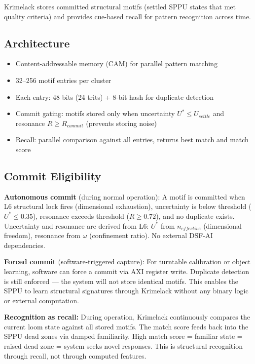 \documentclass[11pt, a4paper]{article}
\begin{document}
Krimelack stores committed structural motifs (settled SPPU states
that met quality criteria) and provides cue-based recall for
pattern recognition across time.

\subsection{Architecture}

\begin{itemize}[nosep]
  \item Content-addressable memory (CAM) for parallel pattern matching
  \item 32--256 motif entries per cluster
  \item Each entry: 48 bits (24 trits) + 8-bit hash for duplicate detection
  \item Commit gating: motifs stored only when uncertainty $U^* \leq U_{settle}$
        and resonance $R \geq R_{commit}$ (prevents storing noise)
  \item Recall: parallel comparison against all entries, returns best match
        and match score
\end{itemize}

\subsection{Commit Eligibility}

\textbf{Autonomous commit} (during normal operation):
A motif is committed when L6 structural lock fires (dimensional
exhaustion), uncertainty is below threshold ($U^* \leq 0.35$),
resonance exceeds threshold ($R \geq 0.72$), and no duplicate
exists. Uncertainty and resonance are derived from L6: $U^*$ from
$n_{effective}$ (dimensional freedom), resonance from $\omega$
(confinement ratio). No external DSF-AI dependencies.

\textbf{Forced commit} (software-triggered capture):
For turntable calibration or object learning, software can force
a commit via AXI register write. Duplicate detection is still
enforced --- the system will not store identical motifs. This
enables the SPPU to learn structural signatures through Krimelack
without any binary logic or external computation.

\textbf{Recognition as recall:} During operation, Krimelack
continuously compares the current loom state against all stored
motifs. The match score feeds back into the SPPU dead zones via
damped familiarity. High match score = familiar state = raised
dead zone = system seeks novel responses. This is structural
recognition through recall, not through computed features.
\end{document}
